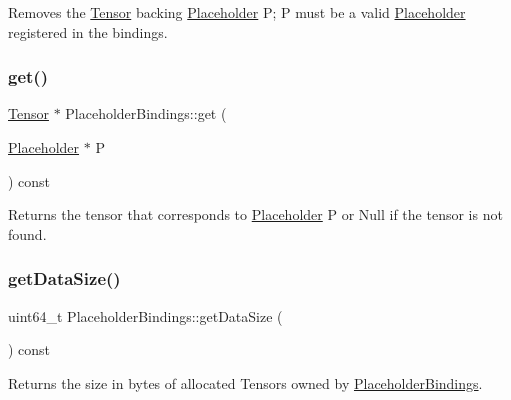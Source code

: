 Removes the \hyperlink{classglow_1_1_tensor}{Tensor} backing \hyperlink{classglow_1_1_placeholder}{Placeholder} {\ttfamily P}; {\ttfamily P} must be a valid \hyperlink{classglow_1_1_placeholder}{Placeholder} registered in the bindings. \mbox{\label{classglow_1_1_placeholder_bindings_a98bdcb9a47a36f8dce6d0f2d86a0080c}} 
\subsubsection{\texorpdfstring{get()}{get()}}
{\footnotesize\ttfamily \hyperlink{classglow_1_1_tensor}{Tensor} $\ast$ Placeholder\+Bindings\+::get (\begin{DoxyParamCaption}\item[{\hyperlink{classglow_1_1_placeholder}{Placeholder} $\ast$}]{P }\end{DoxyParamCaption}) const}

\begin{DoxyReturn}{Returns}
the tensor that corresponds to \hyperlink{classglow_1_1_placeholder}{Placeholder} {\ttfamily P} or Null if the tensor is not found. 
\end{DoxyReturn}
\mbox{\label{classglow_1_1_placeholder_bindings_a685ce6158dca1118a743fb60ec9c7182}} 
\subsubsection{\texorpdfstring{get\+Data\+Size()}{getDataSize()}}
{\footnotesize\ttfamily uint64\+\_\+t Placeholder\+Bindings\+::get\+Data\+Size (\begin{DoxyParamCaption}{ }\end{DoxyParamCaption}) const}

\begin{DoxyReturn}{Returns}
the size in bytes of allocated Tensors owned by \hyperlink{classglow_1_1_placeholder_bindings}{Placeholder\+Bindings}. 
\end{DoxyReturn}
\mbox{\label{classglow_1_1_placeholder_bindings_a00ccce9fce94434ef6c3462a34fcef2d}} 
